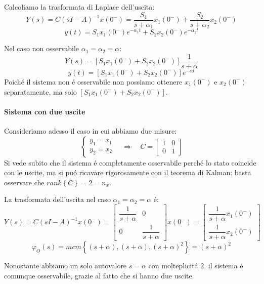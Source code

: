 \documentclass[../main.tex]{subfiles}
\begin{document}
\begin{mdframed}[style=Exercise]
\begin{Exercise}[title={Studiare l'osservabilit\'a di due vasche in parallelo}]
					Calcoliamo la trasformata di Laplace dell'uscita:
					\[
						Y(s) = C(sI-A)^{-1} x(0^{-}) = \dfrac{S_1}{s+\alpha_1}x_1(0^{-}) + \dfrac{S_2}{s+\alpha_2}x_2(0^{-})
					\]
					\[
						y(t) = S_1x_1(0^{-}) e^{-\alpha_1 t} + S_2x_2(0^{-}) e^{-\alpha_2 t}
					\]
					
					Nel caso non osservabile $ \alpha_1 = \alpha_2 = \alpha $:
					\[
						Y(s) = [S_1 x_1(0^{-}) + S_2 x_2(0^{-})] \dfrac{1}{s+\alpha}
					\]
					\[
						y(t) = [S_1 x_1(0^{-}) + S_2 x_2(0^{-})] e^{-\alpha t}
					\]
					Poich\'e il sistema non \'e osservabile non possiamo ottenere $ x_1(0^{-}) $ e $ x_2(0^{-}) $ separatamente, ma solo $ \left[ S_1 x_1(0^{-}) + S_2 x_2(0^{-}) \right] $.
				
				\paragraph{Sistema con due uscite}
					Consideriamo adesso il caso in cui abbiamo due misure:
					\[
						\begin{cases}
							y_1 = x_1\\
							y_2 = x_2
						\end{cases}
						\quad\Rightarrow\quad
						C =
						\begin{bmatrix}
							1 & 0\\
							0 & 1
						\end{bmatrix}
					\]
					Si vede subito che il sistema \'e completamente osservabile perch\'e lo stato coincide con le uscite, ma si pu\'o ricavare rigorosamente con il teorema di Kalman: basta osservare che $ rank\left\lbrace C \right\rbrace = 2 = n_x $.
					
					La trasformata dell'uscita nel caso $ \alpha_1 = \alpha_2 = \alpha $ \'e:
					\[
						Y(s) = C(sI-A)^{-1} x(0^{-}) =
						\begin{bmatrix}
							\dfrac{1}{s+\alpha} & 0\\
							0 & \dfrac{1}{s+\alpha}
						\end{bmatrix} x(0^{-}) =
						\begin{bmatrix}
							\dfrac{1}{s+\alpha} x_1(0^{-})
							\\[1em]
							\dfrac{1}{s+\alpha} x_2(0^{-})
						\end{bmatrix}
					\]
					\[
						\varphi_O(s) = mcm\left\lbrace (s+\alpha), (s+\alpha), (s+\alpha)^2 \right\rbrace = (s+\alpha)^2
					\]
					
					Nonostante abbiamo un solo autovalore $ s = \alpha $ con molteplicit\'a $ 2 $, il sistema \'e comunque osservabile, grazie al fatto che si hanno due uscite.
			\end{Exercise}
		\end{mdframed}
\end{document}
